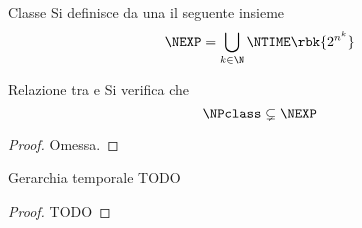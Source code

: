 \documentclass[a4paper, 12pt]{report}
\begin{document}
    \begin{frameddefn}{Classe \NEXP}
        Si definisce  da una \NTM il seguente insieme $$\NEXP = \bigcup_{k \in \N}{\NTIME \rbk{2^{n^k}}}$$
    \end{frameddefn}

    \begin{framedprop}{Relazione tra \NPclass e \NEXP}
        Si verifica che $$\NPclass \subsetneq \NEXP$$
    \end{framedprop}

    \begin{proof}
        Omessa.
    \end{proof}

    \begin{framedcor}{Gerarchia temporale}
        TODO
    \end{framedcor}

    \begin{proof}
        TODO
    \end{proof}
\end{document}

